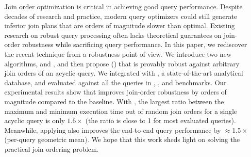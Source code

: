 Join order optimization is critical in achieving good query performance. Despite decades of research and practice, modern query optimizers could still generate inferior join plans that are orders of magnitude slower than optimal. Existing research on robust query processing often lacks theoretical guarantees on join-order robustness while sacrificing query performance. In this paper, we rediscover the recent \PT technique from a robustness point of view. We introduce two new algorithms, \TreeStruct and \SafeSubJoin, and then propose \RPT (\rpt) that is provably robust against arbitrary join orders of an acyclic query. We integrated \RPT with \duckdb, a state-of-the-art analytical database, and evaluated against all the queries in \tpch, \job, and \tpcds benchmarks. Our experimental results show that \rpt improves join-order robustness by orders of magnitude compared to the baseline. With \rpt, the largest ratio between the maximum and minimum execution time out of random join orders for a single acyclic query is only $1.6\times$ (the ratio is close to 1 for most evaluated queries). Meanwhile, applying \rpt also improves the end-to-end query performance by $\approx$$1.5\times$ (per-query geometric mean). We hope that this work sheds light on solving the practical join ordering problem.
